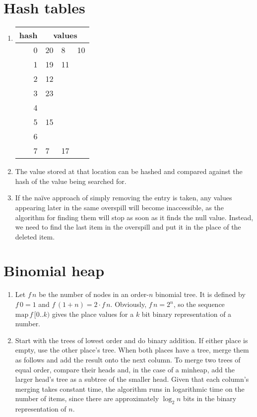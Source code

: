 \documentclass[11pt]{article}
\begin{document}
\section{Hash tables}
\begin{enumerate}
\item
  \begin{tabular}[t]{r || l | l | l}
    hash & \multicolumn{3}{|c}{values} \\
    \hline
    0 & 20 & 8  & 10 \\
    1 & 19 & 11 & \\
    2 & 12 &    & \\
    3 & 23 &    & \\
    4 &    &    & \\
    5 & 15 &    & \\
    6 &    &    & \\
    7 & 7  & 17 & \\
  \end{tabular}
\item The value stored at that location can be hashed and compared against the hash of the value being searched for.
\item If the naïve approach of simply removing the entry is taken, any values appearing later in the same overspill will become inaccessible, as the algorithm for finding them will stop as soon as it finds the null value. Instead, we need to find the last item in the overspill and put it in the place of the deleted item.
\end{enumerate}

\section{Binomial heap}
\begin{enumerate}
\item Let \(f\,n\) be the number of nodes in an order-\(n\) binomial tree. It is defined by \(f\,0=1\) and \(f\,(1+n)=2\cdot f\,n\). Obviously, \(f\,n=2^n\), so the sequence \(\mathrm{map}\,f\,[0..k)\) gives the place values for a \(k\) bit binary representation of a number.
\item Start with the trees of lowest order and do binary addition. If either place is empty, use the other place's tree. When both places have a tree, merge them as follows and add the result onto the next column. To merge two trees of equal order, compare their heads and, in the case of a minheap, add the larger head's tree as a subtree of the smaller head. Given that each column's merging takes constant time, the algorithm runs in logarithmic time on the number of items, since there are approximately \(\log_2n\) bits in the binary representation of \(n\).
\end{enumerate}
\end{document}

